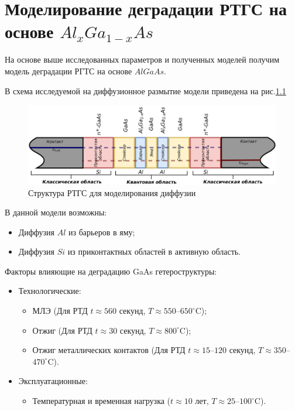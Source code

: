 \chapter{Моделирование деградации РТГС на основе $Al_{x}Ga_{1−x}As$}
На основе выше исследованных параметров и полученных моделей получим модель деградации РГТС на основе $AlGaAs$.

В схема исследуемой на диффузионное размытие модели приведена на рис.\ref{fig:RTHSModelDiff}

\begin{figure}
	\centering
	\includegraphics[width=0.9\linewidth]{assets/RTHSModelDiff}
	\caption{Структура РТГС для моделирования диффузии}
	\label{fig:RTHSModelDiff}
\end{figure}

В данной модели возможны:
\begin{itemize}
	\item Диффузия $Al$ из барьеров в яму;
	\item Диффузия $Si$ из приконтактных областей в активную область.
\end{itemize}

Факторы влияющие на деградацию GaAs гетероструктуры:
\begin{itemize}
	\item Технологические: \begin{itemize}
		\item МЛЭ (Для РТД $t\approx560$ секунд, $T\approx550$--$650^{\circ}$C);
		\item Отжиг (Для РТД $t\approx30$ секунд, $T\approx800^{\circ}$C);
		\item Отжиг металлических контактов (Для РТД $t\approx15$--$120$ секунд, $T\approx350$--$470^{\circ}$C).
	\end{itemize}
	\item Эксплуатационные:
	\begin{itemize}
		\item Температурная и временная нагрузка ($t\approx 10$ лет, $T\approx25$--$100^{\circ}$C).
	\end{itemize}
\end{itemize}

